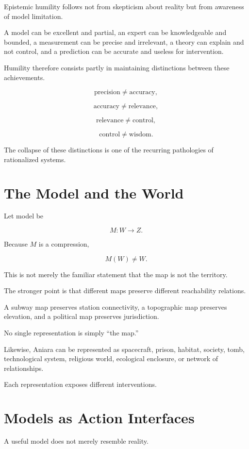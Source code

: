 \documentclass[11pt,oneside]{book}
\theoremstyle{definition}
\theoremstyle{remark}
\begin{document}
Epistemic humility follows not from skepticism about reality but from awareness of model limitation.

A model can be excellent and partial, an expert can be knowledgeable and bounded, a measurement can be precise and irrelevant, a theory can explain and not control, and a prediction can be accurate and useless for intervention.

Humility therefore consists partly in maintaining distinctions between these achievements.

\[
\text{precision}
\neq
\text{accuracy},
\]

\[
\text{accuracy}
\neq
\text{relevance},
\]

\[
\text{relevance}
\neq
\text{control},
\]

\[
\text{control}
\neq
\text{wisdom}.
\]

The collapse of these distinctions is one of the recurring pathologies of rationalized systems.

\section{The Model and the World}

Let model be

\[
M:W\rightarrow Z.
\]

Because \(M\) is a compression,

\[
M(W)\neq W.
\]

This is not merely the familiar statement that the map is not the territory.

The stronger point is that different maps preserve different reachability relations.

A subway map preserves station connectivity, a topographic map preserves elevation, and a political map preserves jurisdiction.

No single representation is simply ``the map.''

Likewise, Aniara can be represented as spacecraft, prison, habitat, society, tomb, technological system, religious world, ecological enclosure, or network of relationships.

Each representation exposes different interventions.

\section{Models as Action Interfaces}

A useful model does not merely resemble reality.
\end{document}
